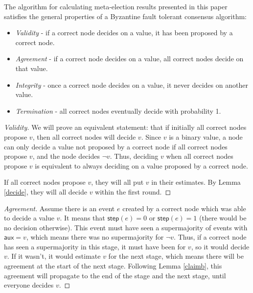 \documentclass[a4paper,fleqn]{article}
\begin{document}
\begin{thm}\label{binconsensus}
	The algorithm for calculating meta-election results presented in this paper satisfies the
	general properties of a Byzantine fault tolerant consensus algorithm:
	\begin{itemize}
		\item \emph{Validity} - if a correct node decides on a value, it has been proposed by a
			correct node.
		\item \emph{Agreement} - if a correct node decides on a value, all correct nodes decide
			on that value.
		\item \emph{Integrity} - once a correct node decides on a value, it never decides on
			another value.
		\item \emph{Termination} - all correct nodes eventually decide with probability 1.
	\end{itemize}
\end{thm}

\begin{proof}[Validity]
	We will prove an equivalent statement: that if initially all correct nodes propose $v$, then
	all correct nodes will decide $v$. Since $v$ is a binary value, a node can only decide a value
	not proposed by a correct node if all correct nodes propose $v$, and the node decides $\neg v$.
	Thus, deciding $v$ when all correct nodes propose $v$ is equivalent to always deciding on a
	value proposed by a correct node.

	If all correct nodes propose $v$, they will all put $v$ in their estimates. By Lemma
	\ref{decide}, they will all decide $v$ within the first round.
\end{proof}

\begin{proof}[Agreement]
	Assume there is an event $e$ created by a correct node which was able to decide a value $v$. It 
	means that $\mathsf{step}(e) = 0$ or $\mathsf{step}(e) = 1$ (there would be no decision
	otherwise). This event must have seen a supermajority of events with $\mathsf{aux} = v$, which
	means there was no supermajority for $\neg v$. Thus, if a correct node has seen a supermajority
	in this stage, it must have been for $v$, so it would decide $v$. If it wasn't, it would
	estimate $v$ for the next stage, which means there will be agreement at the start of the next
	stage. Following Lemma \ref{claimb}, this agreement will propagate to the end of the stage and
	the next stage, until everyone decides $v$.
\end{proof}
\end{document}
